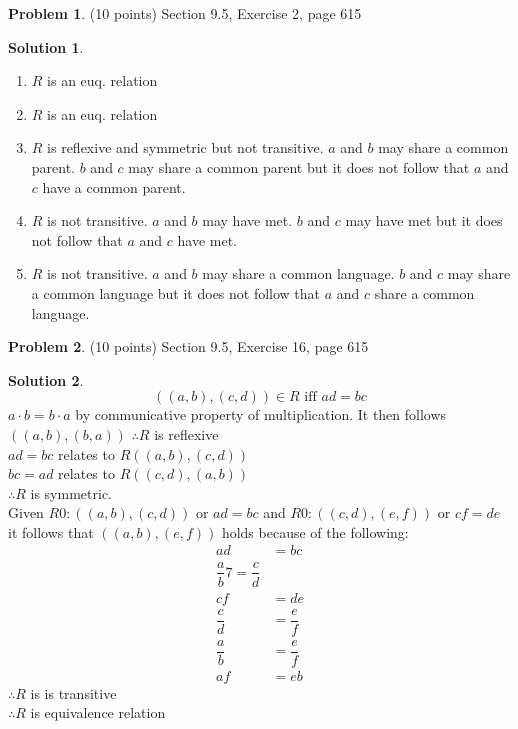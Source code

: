 \documentclass{article}
\theoremstyle{definition}
\newtheorem{problem}{Problem}
\newtheorem*{solution}{Solution}
\begin{document}
\begin{problem} (10 points)
Section 9.5, Exercise 2, page 615
\end{problem}
\begin{solution} \ \\
  \begin{enumerate}[label=(\alph*)]
    \item $R$ is an euq. relation
    \item $R$ is an euq. relation
    \item $R$ is reflexive and symmetric but not transitive. $a$ and $b$ may share a common parent. $b$ and $c$ may share a common parent but it does not follow that $a$ and $c$ have a common parent.
    \item $R$ is not transitive. $a$ and $b$ may have met. $b$ and $c$ may have met but it does not follow that $a$ and $c$ have met.
    \item $R$ is not transitive. $a$ and $b$ may share a common language. $b$ and $c$ may share a common language but it does not follow that $a$ and $c$ share a common language.
  \end{enumerate}
\end{solution}

\begin{problem} (10 points)
Section 9.5, Exercise 16, page 615
\end{problem}
\begin{solution} 
  $$ ((a, b), (c, d) ) \in R \text{ iff } ad = bc$$
  $a \cdot b = b \cdot a$ by communicative property of multiplication. It then follows $( (a,b), (b,a))$ $\therefore R$ is reflexive  \\
  $ad = bc$ relates to $R((a,b),(c,d))$ \\
  $bc = ad$ relates to $R((c,d),(a,b))$ \\
  $\therefore R$ is symmetric. \\
  Given $R0: ((a,b),(c,d))$ or $ad = bc$ and $R0: ((c,d),(e,f))$ or $cf=de$ it follows that $((a,b),(e,f))$ holds because of the following:
  \begin{align*}
    ad &= bc \\
    \dfrac{a}{b} 7= \dfrac{c}{d} \\
    cf &= de \\
    \dfrac{c}{d} &= \dfrac{e}{f} \\
    \dfrac{a}{b} &= \dfrac{e}{f} \\
    af &= eb
  \end{align*}
  $\therefore R$ is is transitive \\
  $\therefore R$ is equivalence relation  
\end{solution}
\end{document}

